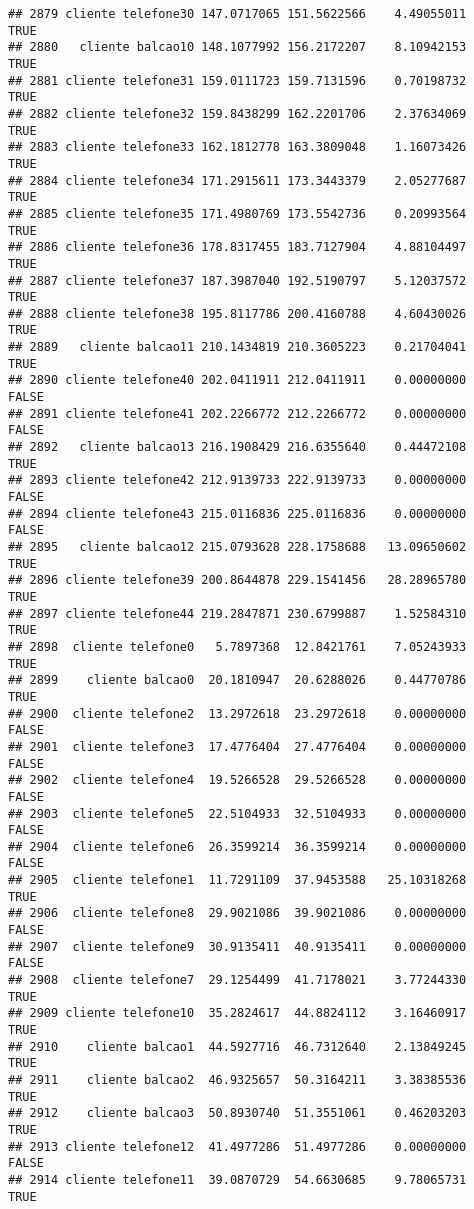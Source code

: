 \documentclass[
]{article}
\begin{document}
\begin{verbatim}
## 2879 cliente telefone30 147.0717065 151.5622566    4.49055011     TRUE
## 2880   cliente balcao10 148.1077992 156.2172207    8.10942153     TRUE
## 2881 cliente telefone31 159.0111723 159.7131596    0.70198732     TRUE
## 2882 cliente telefone32 159.8438299 162.2201706    2.37634069     TRUE
## 2883 cliente telefone33 162.1812778 163.3809048    1.16073426     TRUE
## 2884 cliente telefone34 171.2915611 173.3443379    2.05277687     TRUE
## 2885 cliente telefone35 171.4980769 173.5542736    0.20993564     TRUE
## 2886 cliente telefone36 178.8317455 183.7127904    4.88104497     TRUE
## 2887 cliente telefone37 187.3987040 192.5190797    5.12037572     TRUE
## 2888 cliente telefone38 195.8117786 200.4160788    4.60430026     TRUE
## 2889   cliente balcao11 210.1434819 210.3605223    0.21704041     TRUE
## 2890 cliente telefone40 202.0411911 212.0411911    0.00000000    FALSE
## 2891 cliente telefone41 202.2266772 212.2266772    0.00000000    FALSE
## 2892   cliente balcao13 216.1908429 216.6355640    0.44472108     TRUE
## 2893 cliente telefone42 212.9139733 222.9139733    0.00000000    FALSE
## 2894 cliente telefone43 215.0116836 225.0116836    0.00000000    FALSE
## 2895   cliente balcao12 215.0793628 228.1758688   13.09650602     TRUE
## 2896 cliente telefone39 200.8644878 229.1541456   28.28965780     TRUE
## 2897 cliente telefone44 219.2847871 230.6799887    1.52584310     TRUE
## 2898  cliente telefone0   5.7897368  12.8421761    7.05243933     TRUE
## 2899    cliente balcao0  20.1810947  20.6288026    0.44770786     TRUE
## 2900  cliente telefone2  13.2972618  23.2972618    0.00000000    FALSE
## 2901  cliente telefone3  17.4776404  27.4776404    0.00000000    FALSE
## 2902  cliente telefone4  19.5266528  29.5266528    0.00000000    FALSE
## 2903  cliente telefone5  22.5104933  32.5104933    0.00000000    FALSE
## 2904  cliente telefone6  26.3599214  36.3599214    0.00000000    FALSE
## 2905  cliente telefone1  11.7291109  37.9453588   25.10318268     TRUE
## 2906  cliente telefone8  29.9021086  39.9021086    0.00000000    FALSE
## 2907  cliente telefone9  30.9135411  40.9135411    0.00000000    FALSE
## 2908  cliente telefone7  29.1254499  41.7178021    3.77244330     TRUE
## 2909 cliente telefone10  35.2824617  44.8824112    3.16460917     TRUE
## 2910    cliente balcao1  44.5927716  46.7312640    2.13849245     TRUE
## 2911    cliente balcao2  46.9325657  50.3164211    3.38385536     TRUE
## 2912    cliente balcao3  50.8930740  51.3551061    0.46203203     TRUE
## 2913 cliente telefone12  41.4977286  51.4977286    0.00000000    FALSE
## 2914 cliente telefone11  39.0870729  54.6630685    9.78065731     TRUE

\end{verbatim}
\end{document}
